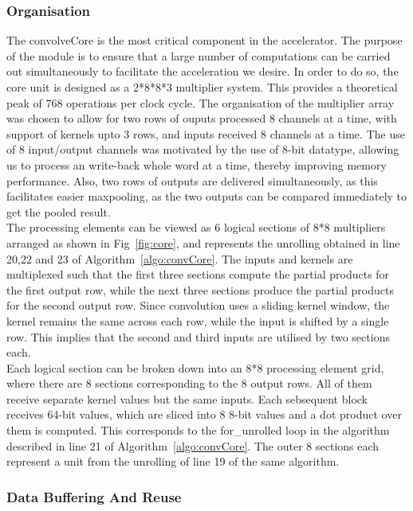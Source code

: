\documentclass[a4paper,12pt, final]{report}
\begin{document}
\subsubsection{Organisation}

The convolveCore is the most critical component in the accelerator. The purpose of the module is to ensure that a large number of computations can be carried out simultaneously to facilitate the acceleration we desire. In order to do so, the core unit is designed as a 2*8*8*3 multiplier system. This provides a theoretical peak of 768 operations per clock cycle. The organisation of the multiplier array was chosen to allow for two rows of ouputs processed 8 channels at a time, with support of kernels upto 3 rows, and inputs received 8 channels at a time. The use of 8 input/output channels was motivated by the use of 8-bit datatype, allowing us to process an write-back whole word at a time, thereby improving memory performance. Also, two rows of outputs are delivered simultaneously, as this facilitates easier maxpooling, as the two outputs can be compared immediately to get the pooled result.
\\

The processing elements can be viewed as 6 logical sections of 8*8 multipliers arranged as shown in Fig~\ref{fig:core}, and represents the unrolling obtained in line 20,22 and 23 of Algorithm~\ref{algo:convCore}. The inputs and kernels are multiplexed such that the first three sections compute the partial products for the first output row, while the next three sections produce the partial products for the second output row. Since convolution uses a sliding kernel window, the kernel remains the same across each row, while the input is shifted by a single row. This implies that the second and third inputs are utilised by two sections each.
\\

Each logical section can be broken down into an 8*8 processing element grid, where there are 8 sections corresponding to the 8 output rows. All of them receive separate kernel values but the same inputs. Each sebsequent block receives 64-bit values, which are sliced into 8 8-bit values and a dot product over them is computed. This corresponds to the for\_unrolled loop in the algorithm described in line 21 of Algorithm~\ref{algo:convCore}. The outer 8 sections each represent a unit from the unrolling of line 19 of the same algorithm.
\\

\subsubsection{Data Buffering And Reuse}
\end{document}
